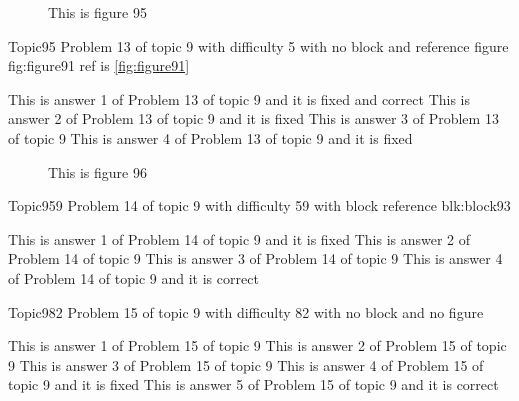 \documentclass[master]{exam}
\begin{document}
\begin{figure}
	\begin{center}
		This is figure 95 
		\label{fig:figure95}
	\end{center}
\end{figure}

\begin{problem}{Topic9}{5}
	Problem 13 of topic 9 with difficulty 5 with no block and reference figure fig:figure91 ref is \ref{fig:figure91}
	\begin{answers}
		 This is answer 1 of Problem 13 of topic 9 and it is fixed and correct
		\answer[fixed] This is answer 2 of Problem 13 of topic 9 and it is fixed
		\answer This is answer 3 of Problem 13 of topic 9 
		\answer[fixed] This is answer 4 of Problem 13 of topic 9 and it is fixed
	\end{answers}
\end{problem}



\begin{figure}
	\begin{center}
		This is figure 96 
		\label{fig:figure96}
	\end{center}
\end{figure}

\begin{problem}[requires=blk:block93]{Topic9}{59}
	Problem 14 of topic 9 with difficulty 59 with block reference blk:block93
	\begin{answers}
		\answer[fixed] This is answer 1 of Problem 14 of topic 9 and it is fixed
		\answer This is answer 2 of Problem 14 of topic 9 
		\answer This is answer 3 of Problem 14 of topic 9 
		\answer[correct] This is answer 4 of Problem 14 of topic 9 and it is correct
	\end{answers}
\end{problem}

\begin{problem}{Topic9}{82}
	Problem 15 of topic 9 with difficulty 82 with no block and no figure
	\begin{answers}
		\answer This is answer 1 of Problem 15 of topic 9 
		\answer This is answer 2 of Problem 15 of topic 9 
		\answer This is answer 3 of Problem 15 of topic 9 
		\answer[fixed] This is answer 4 of Problem 15 of topic 9 and it is fixed
		\answer[correct] This is answer 5 of Problem 15 of topic 9 and it is correct
	\end{answers}
\end{problem}
\end{document}
